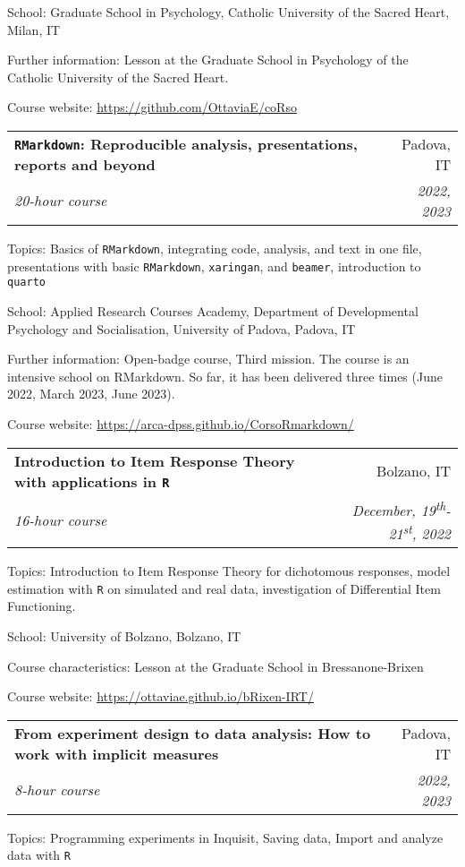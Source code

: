 \documentclass[letterpaper,12pt]{article}
\makeatletter
\newcommand{\resumeSubheading}[4]{
  \vspace{-1pt}\item
    \begin{tabular*}{0.97\textwidth}{l@{\extracolsep{\fill}}r}
      \textbf{#1} & #2 \\
      \textit{\small#3} & \textit{\small #4} \\
    \end{tabular*}\vspace{-5pt}
}
\makeatother
\begin{document}
{\small School: Graduate School in Psychology, Catholic University of the Sacred Heart, Milan,  IT} 

{\small Further information: Lesson at the Graduate School in Psychology of the Catholic University of the Sacred Heart. }

{\small Course website:  \href{https://github.com/OttaviaE/coRso}{https://github.com/OttaviaE/coRso}} 


\resumeSubheading {\texttt{RMarkdown}: Reproducible analysis, presentations, reports and beyond}{Padova, IT}{20-hour course}{\small{ 2022,  2023}}

{\small Topics: Basics of \texttt{RMarkdown}, integrating code, analysis, and text in one file, presentations with basic \texttt{RMarkdown}, \texttt{xaringan}, and \texttt{beamer}, introduction to \texttt{quarto}}

{\small School: Applied Research Courses Academy, Department of Developmental Psychology and Socialisation, University of Padova, Padova, IT} 

{\small Further information: Open-badge course, Third mission. The course is an intensive school on RMarkdown. So far, it has been delivered three times (June 2022, March 2023, June 2023). } 

{\small Course website: \href{https://arca-dpss.github.io/CorsoRmarkdown/}{https://arca-dpss.github.io/CorsoRmarkdown/}}


\resumeSubheading {Introduction to Item Response Theory with applications in \texttt{R}}{Bolzano, IT}{16-hour course}{December, 19\textsuperscript{th}-21\textsuperscript{st}, 2022}

{\small Topics: Introduction to Item Response Theory for dichotomous responses, model estimation with \texttt{R} on simulated and real data, investigation of Differential Item Functioning. }

{\small School: University of Bolzano, Bolzano, IT} 

{\small Course characteristics: Lesson at the Graduate School in Bressanone-Brixen} 

{\small Course website:  \href{https://ottaviae.github.io/bRixen-IRT/}{https://ottaviae.github.io/bRixen-IRT/}} 

\resumeSubheading {From experiment design to data analysis: How to work with implicit measures}{Padova, IT}{8-hour course}{2022, 2023}

{\small Topics: Programming experiments in Inquisit, Saving data, Import and analyze data with \texttt{R}}
\end{document}
